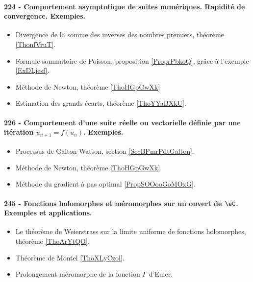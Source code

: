 \paragraph{224 - Comportement asymptotique de suites numériques. Rapidité de convergence. Exemples.}
\begin{itemize}
    \item Divergence de la somme des inverses des nombres premiers, théorème \ref{ThonfVruT}.
    \item Formule sommatoire de Poisson, proposition \ref{ProprPbkoQ}, grâce à l'exemple \ref{ExDLjesf}.
    \item Méthode de Newton, théorème \ref{ThoHGpGwXk}
    \item Estimation des grands écarts, théorème \ref{ThoYYaBXkU}.
\end{itemize}
\paragraph{226 - Comportement d’une suite réelle ou vectorielle définie par une itération \( u_{n+1}=f(u_n)\). Exemples.}
\begin{itemize}
    \item Processus de Galton-Watson, section \ref{SecBPmrPdtGalton}.
    \item Méthode de Newton, théorème \ref{ThoHGpGwXk}
    \item Méthode du gradient à pas optimal \ref{PropSOOooGoMOxG}.
\end{itemize}
\paragraph{245 - Fonctions holomorphes et méromorphes sur un ouvert de \( \eC\). Exemples et applications.}
\begin{itemize}
    \item Le théorème de Weierstrass sur la limite uniforme de fonctions holomorphes, théorème \ref{ThoArYtQO}.
    \item Théorème de Montel \ref{ThoXLyCzol}.
    \item Prolongement méromorphe de la fonction \( \Gamma\) d'Euler.
\end{itemize}
